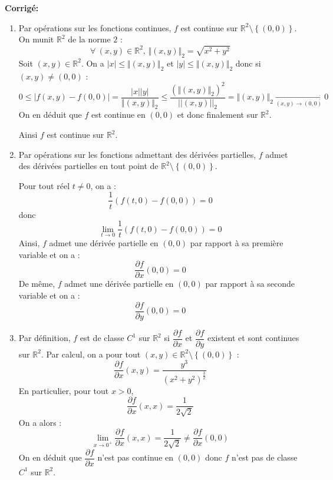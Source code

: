 \documentclass[a4paper,twoside,french,11pt]{VcCours}
\newcommand{\corr}{\textbf{Corrigé:}}
\begin{document}
\corr
\begin{enumerate}

\item Par opérations sur les fonctions continues, $f$ est continue sur  $\mathbb{R}^2 \setminus \left\{ {(0,0)} \right\}$.
On munit $\mathbb{R}^2$ de la norme $2$ :
$$\forall\:(x,y)\in\mathbb{R}^2, \,  \Vert (x,y) \Vert_2 = \sqrt{x^2+y^2}$$
Soit $(x,y)\in\mathbb{R}^2$. On a $|x|\leq \Vert (x,y) \Vert_2$ et $|y|\leq \Vert (x,y) \Vert_2$ donc si $(x,y) \neq (0,0)$ :
$$ 0 \leq |f(x,y)-f(0,0)|=\dfrac{|x||y|}{\Vert (x,y) \Vert_2}\leq\dfrac{\left(\Vert (x,y) \Vert_2\right) ^2}{||(x,y)||_2}=\Vert (x,y) \Vert_2\underset{(x,y)\to (0,0)}{\longrightarrow} 0$$
On en déduit que $f$ est continue en $(0,0)$ et donc finalement sur $\mathbb{R}^2$.

Ainsi $f$ est continue sur $\mathbb{R}^2 $.
\item Par opérations sur les fonctions admettant des dérivées partielles, $f$ admet des dérivées partielles en tout point de $\mathbb{R}^2 \setminus \left\{ {(0,0)} \right\}$.


Pour tout réel $t \neq 0$, on a :
$$ \dfrac{1}{t}\left( {f(t,0) - f(0,0)} \right) = 0$$
donc 
$$\mathop {\lim }\limits_{t \to 0} \dfrac{1}{t}\left( {f(t,0) - f(0,0)} \right) = 0$$
Ainsi, $f$ admet une dérivée partielle en $(0,0)$ par rapport à sa première variable et on a :
$$\dfrac{{\partial f}}{{\partial x}}(0,0) = 0$$
De même, $f$ admet une  dérivée partielle en $(0,0)$ par rapport à sa seconde variable et on a :
$$\dfrac{{\partial f}}{{\partial y}}(0,0) = 0$$
\item Par définition, $f$ est de classe $C^{1}$ sur $\mathbb{R}^{2}$ si $\dfrac{\partial f}{ \partial x}$ et $\dfrac{\partial f}{ \partial y }$ existent et sont continues sur $\mathbb{R}^{2}$. Par calcul, on a pour tout $(x,y)\in\mathbb{R}^2 \setminus \left\{ {(0,0)} \right\}$ :
$$\dfrac{\partial f}{ \partial x}(x,y)=\dfrac{y^3}{\left( x^2+y^2\right)^{\frac{3}{2}} }$$
En particulier, pour tout $x>0$,   
$$\dfrac{\partial f}{ \partial x}(x,x)=\dfrac{1}{2\sqrt{2}}$$
On a alors :
$$\lim\limits_{x\to 0^{+}}^{}\dfrac{\partial f}{ \partial x}(x,x)=\dfrac{1}{2\sqrt{2}}\neq \dfrac{\partial f}{ \partial x}(0,0) $$
On en déduit que $\dfrac{\partial f}{ \partial x}$ n'est pas continue  en $(0,0)$ donc $f$ n'est pas de classe $C^{1}$ sur $\mathbb{R}^{2}$.

\end{enumerate}
\end{document}
